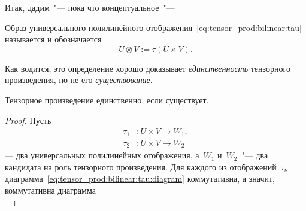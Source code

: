 Итак, дадим~"--- пока что концептуальное~"---
\begin{definition}
	Образ универсального полилинейного отображения~\eqref{eq:tensor_prod:bilinear:tau} называется  и обозначается
	\[
		U \otimes V :=
		\tau(U \times V)
		.
	\]
\end{definition}

Как водится, это определение хорошо доказывает \emph{единственность} тензорного произведения, но не его \emph{существование}.

\begin{lemma}
	Тензорное произведение единственно, если существует.
\end{lemma}
\begin{proof}
	Пусть
	\begin{align*}
		\tau_1 &\colon U \times V \to W_1,
		\\
		\tau_2 &\colon U \times V \to W_2
	\end{align*}
	--- два универсальных полилинейных отображения, а~$W_1$ и~$W_2$~"--- два кандидата на роль тензорного произведения. Для каждого из отображений~$\tau_\nu$ диаграмма~\eqref{eq:tensor_prod:bilinear:tau:diagram} коммутативна, а значит, коммутативна диаграмма
	\[
	\]
\end{proof} 



\fi
